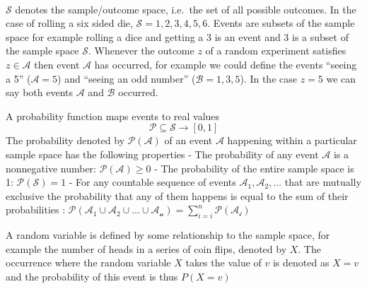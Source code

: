 \documentclass[12pt letter]{report}
\begin{document}
    \begin{center}
    \end{center}
    { \hspace*{\fill} \\}
    
\(\mathcal{S}\) denotes the sample/outcome space, i.e.~the set of all
possible outcomes. In the case of rolling a six sided die,
\(\mathcal{S} = {1,2,3,4,5,6}\). Events are subsets of the sample space
for example rolling a dice and getting a 3 is an event and 3 is a subset
of the sample space \(\mathcal{S}\). Whenever the outcome \(z\) of a
random experiment satisfies \(z \in\mathcal{A}\) then event
\(\mathcal{A}\) has occurred, for example we could define the events
``seeing a 5'' (\(\mathcal{A} = 5\)) and ``seeing an odd number''
(\(\mathcal{B} = {1,3,5}\)). In the case \(z=5\) we can say both events
\(\mathcal{A}\) and \(\mathcal{B}\) occurred.

A probability function maps events to real values \[
\mathcal{P} \subseteq \mathcal{S} \to [0, 1]
\] The probability denoted by \(\mathcal{P}(\mathcal{A})\) of an event
\(\mathcal{A}\) happening within a particular sample space has the
following properties - The probability of any event \(\mathcal{A}\) is a
nonnegative number: \(\mathcal{P}(\mathcal{A}) \geq 0\) - The
probability of the entire sample space is 1:
\(\mathcal{P}(\mathcal{S}) = 1\) - For any countable sequence of events
\(\mathcal{A_1}, \mathcal{A_2}, \ldots\) that are mutually exclusive the
probability that any of them happens is equal to the sum of their
probabilities :
\(\mathcal{P} (\mathcal{A_1} \cup \mathcal{A_2} \cup \ldots \cup \mathcal{A_n}) = \sum_{i=i}^n \mathcal{P}(\mathcal{A_i})\)

A random variable is defined by some relationship to the sample space,
for example the number of heads in a series of coin flips, denoted by
\(X\). The occurrence where the random variable \(X\) takes the value of
\(v\) is denoted as \(X = v\) and the probability of this event is thus
\(P(X = v)\)
\end{document}
